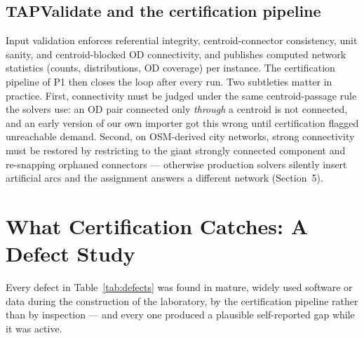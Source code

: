 \documentclass[11pt]{article}
\begin{document}
\subsection{TAPValidate and the certification pipeline}
Input validation enforces referential integrity, centroid-connector
consistency, unit sanity, and centroid-blocked OD connectivity, and
publishes computed network statistics (counts, distributions, OD coverage)
per instance. The certification pipeline of P1 then closes the loop after
every run. Two subtleties matter in practice. First, connectivity must be
judged under the same centroid-passage rule the solvers use: an OD pair
connected only \emph{through} a centroid is not connected, and an early
version of our own importer got this wrong until certification flagged
unreachable demand. Second, on OSM-derived city networks, strong
connectivity must be restored by restricting to the giant strongly
connected component and re-snapping orphaned connectors --- otherwise
production solvers silently insert artificial arcs and the assignment
answers a different network (Section~5).

\section{What Certification Catches: A Defect Study}

Every defect in Table~\ref{tab:defects} was found in mature, widely used
software or data during the construction of the laboratory, by the
certification pipeline rather than by inspection --- and every one produced
a plausible self-reported gap while it was active.
\end{document}
